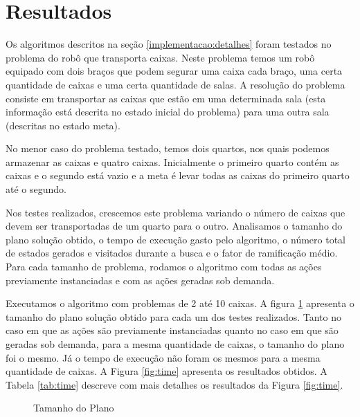 \documentclass[12pt,a4paper]{article}
\begin{document}
\section{Resultados}
Os algoritmos descritos na seção \ref{implementacao:detalhes} foram testados no problema do robô que transporta caixas.
Neste problema temos um robô equipado com dois braços que podem segurar uma caixa cada braço, uma certa quantidade de caixas e uma certa quantidade de salas. A resolução do problema consiste em transportar as caixas que estão em uma determinada sala (esta informação está descrita no estado inicial do problema) para uma outra sala (descritas no estado meta).

No menor caso do problema testado, temos dois quartos, nos quais podemos armazenar as caixas e quatro caixas. 
Inicialmente o primeiro quarto contém as caixas e o segundo está vazio e a meta é levar todas as caixas do primeiro quarto até o segundo.

Nos testes realizados, crescemos este problema variando o número de caixas que devem ser transportadas de um quarto para o outro. Analisamos o tamanho do plano solução obtido, o tempo de execução gasto pelo algoritmo, o número total de estados gerados e visitados durante a busca e o fator de ramificação médio. Para cada tamanho de problema, rodamos o algoritmo com todas as ações previamente instanciadas e com as ações geradas sob demanda.

Executamos o algoritmo com problemas de 2 até 10 caixas. A figura \ref{fig:plano} apresenta o tamanho do plano solução obtido para cada um dos testes realizados. Tanto no caso em que as ações são previamente instanciadas quanto no caso em que são geradas sob demanda, para a mesma quantidade de caixas, o tamanho do plano foi o mesmo. Já o tempo de execução não foram os mesmos para a mesma quantidade de caixas. A Figura \ref{fig:time} apresenta os resultados obtidos. A Tabela \ref{tab:time} descreve com mais detalhes os resultados da Figura \ref{fig:time}.



\begin{figure}[htb]
\centering
{}
\caption{Tamanho do Plano}
\label{fig:plano}
\end{figure}
\end{document}
